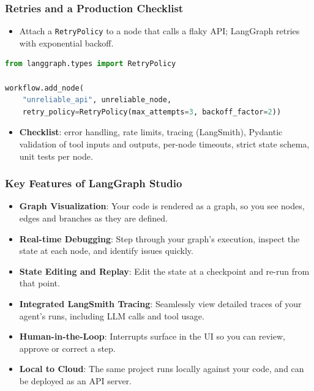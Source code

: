 \begin{frame}[fragile]\frametitle{Retries and a Production Checklist}
      \begin{itemize}
        \item Attach a \texttt{RetryPolicy} to a node that calls a flaky API; LangGraph retries with exponential backoff.
      \end{itemize}
\begin{lstlisting}[language=Python]
from langgraph.types import RetryPolicy

workflow.add_node(
    "unreliable_api", unreliable_node,
    retry_policy=RetryPolicy(max_attempts=3, backoff_factor=2))
\end{lstlisting}
      \begin{itemize}
        \item \textbf{Checklist}: error handling, rate limits, tracing (LangSmith), Pydantic validation of tool inputs and outputs, per-node timeouts, strict state schema, unit tests per node.
      \end{itemize}
\end{frame}
\begin{frame}[fragile]\frametitle{Key Features of LangGraph Studio}
      \begin{itemize}
        \item \textbf{Graph Visualization}: Your code is rendered as a graph, so you see nodes, edges and branches as they are defined.
        \item \textbf{Real-time Debugging}: Step through your graph's execution, inspect the state at each node, and identify issues quickly.
        \item \textbf{State Editing and Replay}: Edit the state at a checkpoint and re-run from that point.
        \item \textbf{Integrated LangSmith Tracing}: Seamlessly view detailed traces of your agent's runs, including LLM calls and tool usage.
        \item \textbf{Human-in-the-Loop}: Interrupts surface in the UI so you can review, approve or correct a step.
        \item \textbf{Local to Cloud}: The same project runs locally against your code, and can be deployed as an API server.
      \end{itemize}
\end{frame}
